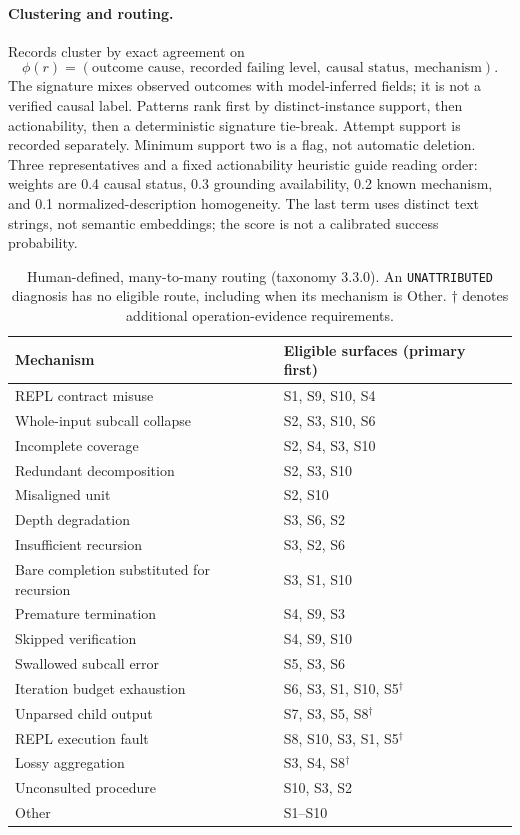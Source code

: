 \paragraph{Clustering and routing.}
Records cluster by exact agreement on
\[
\phi(r)=(\text{outcome cause},\ \text{recorded failing level},\
         \text{causal status},\ \text{mechanism}).
\]
The signature mixes observed outcomes with model-inferred fields; it is not a
verified causal label. Patterns rank first by distinct-instance support, then
actionability, then a deterministic signature tie-break. Attempt support is
recorded separately. Minimum support two is a flag, not automatic deletion.
Three representatives and a fixed actionability heuristic guide reading order:
weights are 0.4 causal status, 0.3 grounding availability, 0.2 known mechanism,
and 0.1 normalized-description homogeneity. The last term uses distinct text
strings, not semantic embeddings; the score is not a calibrated success
probability.

\begin{table}[htbp]
\centering\small
\begin{tabularx}{\linewidth}{@{}Xl@{}}
\toprule
Mechanism & Eligible surfaces (primary first) \\
\midrule
REPL contract misuse & S1, S9, S10, S4 \\
Whole-input subcall collapse & S2, S3, S10, S6 \\
Incomplete coverage & S2, S4, S3, S10 \\
Redundant decomposition & S2, S3, S10 \\
Misaligned unit & S2, S10 \\
Depth degradation & S3, S6, S2 \\
Insufficient recursion & S3, S2, S6 \\
Bare completion substituted for recursion & S3, S1, S10 \\
Premature termination & S4, S9, S3 \\
Skipped verification & S4, S9, S10 \\
Swallowed subcall error & S5, S3, S6 \\
Iteration budget exhaustion & S6, S3, S1, S10, S5$^{\dagger}$ \\
Unparsed child output & S7, S3, S5, S8$^{\dagger}$ \\
REPL execution fault & S8, S10, S3, S1, S5$^{\dagger}$ \\
Lossy aggregation & S3, S4, S8$^{\dagger}$ \\
Unconsulted procedure & S10, S3, S2 \\
Other & S1--S10 \\
\bottomrule
\end{tabularx}
\caption{Human-defined, many-to-many routing (taxonomy 3.3.0).
An \texttt{UNATTRIBUTED} diagnosis has no eligible route, including when its
mechanism is Other. $\dagger$ denotes additional operation-evidence requirements.}
\label{tab:routes}
\end{table}


